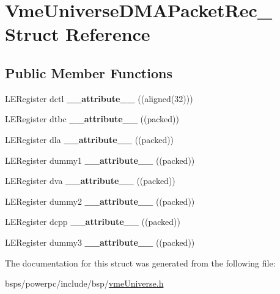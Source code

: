 \hypertarget{structVmeUniverseDMAPacketRec__}{}\section{Vme\+Universe\+D\+M\+A\+Packet\+Rec\+\_\+ Struct Reference}
\label{structVmeUniverseDMAPacketRec__}
\subsection*{Public Member Functions}
\begin{DoxyCompactItemize}
\item 
\mbox{\label{structVmeUniverseDMAPacketRec___a40cf2850d96b2e8efa3558d8fa42a236}} 
L\+E\+Register dctl {\bfseries \+\_\+\+\_\+attribute\+\_\+\+\_\+} ((aligned(32)))
\item 
\mbox{\label{structVmeUniverseDMAPacketRec___a3a26817d41bb1c0408a5b3ea31ed7a41}} 
L\+E\+Register dtbc {\bfseries \+\_\+\+\_\+attribute\+\_\+\+\_\+} ((packed))
\item 
\mbox{\label{structVmeUniverseDMAPacketRec___ad6f288ae639fa2cb08c90090599ce67b}} 
L\+E\+Register dla {\bfseries \+\_\+\+\_\+attribute\+\_\+\+\_\+} ((packed))
\item 
\mbox{\label{structVmeUniverseDMAPacketRec___aa9d9efa044f216300097afb9ba9bde4e}} 
L\+E\+Register dummy1 {\bfseries \+\_\+\+\_\+attribute\+\_\+\+\_\+} ((packed))
\item 
\mbox{\label{structVmeUniverseDMAPacketRec___a1b95d9fa6eb0b652ee0c4a6bd2da27bc}} 
L\+E\+Register dva {\bfseries \+\_\+\+\_\+attribute\+\_\+\+\_\+} ((packed))
\item 
\mbox{\label{structVmeUniverseDMAPacketRec___aa709b32937360cfacd64031c5a890d9e}} 
L\+E\+Register dummy2 {\bfseries \+\_\+\+\_\+attribute\+\_\+\+\_\+} ((packed))
\item 
\mbox{\label{structVmeUniverseDMAPacketRec___afbd3d75e287e52a3040bcce7c0c31846}} 
L\+E\+Register dcpp {\bfseries \+\_\+\+\_\+attribute\+\_\+\+\_\+} ((packed))
\item 
\mbox{\label{structVmeUniverseDMAPacketRec___a29648d609ebba81cdd2776d9cc56f6d1}} 
L\+E\+Register dummy3 {\bfseries \+\_\+\+\_\+attribute\+\_\+\+\_\+} ((packed))
\end{DoxyCompactItemize}


The documentation for this struct was generated from the following file\+:\begin{DoxyCompactItemize}
\item 
bsps/powerpc/include/bsp/\mbox{\hyperlink{vmeUniverse_8h}{vme\+Universe.\+h}}\end{DoxyCompactItemize}
